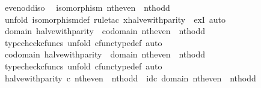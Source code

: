 \begin{isabellebody}
\endisatagproof
{\isafoldproof}%
%
\isadelimproof
\isanewline
%
\endisadelimproof
\isanewline
{}\isamarkupfalse%
\ even{\isacharunderscore}{\kern0pt}odd{\isacharunderscore}{\kern0pt}iso{\isacharcolon}{\kern0pt}\isanewline
\ \ {\isachardoublequoteopen}isomorphism\ {\isacharparenleft}{\kern0pt}nth{\isacharunderscore}{\kern0pt}even\ {\isasymamalg}\ nth{\isacharunderscore}{\kern0pt}odd{\isacharparenright}{\kern0pt}{\isachardoublequoteclose}\isanewline
%
\isadelimproof
%
\endisadelimproof
%
\isatagproof
{}\isamarkupfalse%
\ {\isacharparenleft}{\kern0pt}unfold\ isomorphism{\isacharunderscore}{\kern0pt}def{\isacharcomma}{\kern0pt}\ rule{\isacharunderscore}{\kern0pt}tac\ x{\isacharequal}{\kern0pt}halve{\isacharunderscore}{\kern0pt}with{\isacharunderscore}{\kern0pt}parity\ \ exI{\isacharcomma}{\kern0pt}\ auto{\isacharparenright}{\kern0pt}\isanewline
\ \ \isamarkupfalse%
\ {\isachardoublequoteopen}domain\ halve{\isacharunderscore}{\kern0pt}with{\isacharunderscore}{\kern0pt}parity\ {\isacharequal}{\kern0pt}\ codomain\ {\isacharparenleft}{\kern0pt}nth{\isacharunderscore}{\kern0pt}even\ {\isasymamalg}\ nth{\isacharunderscore}{\kern0pt}odd{\isacharparenright}{\kern0pt}{\isachardoublequoteclose}\isanewline
\ \ \ \ \isamarkupfalse%
\ {\isacharparenleft}{\kern0pt}typecheck{\isacharunderscore}{\kern0pt}cfuncs{\isacharcomma}{\kern0pt}\ unfold\ cfunc{\isacharunderscore}{\kern0pt}type{\isacharunderscore}{\kern0pt}def{\isacharcomma}{\kern0pt}\ auto{\isacharparenright}{\kern0pt}\isanewline
\ \ \isamarkupfalse%
\ {\isachardoublequoteopen}codomain\ halve{\isacharunderscore}{\kern0pt}with{\isacharunderscore}{\kern0pt}parity\ {\isacharequal}{\kern0pt}\ domain\ {\isacharparenleft}{\kern0pt}nth{\isacharunderscore}{\kern0pt}even\ {\isasymamalg}\ nth{\isacharunderscore}{\kern0pt}odd{\isacharparenright}{\kern0pt}{\isachardoublequoteclose}\isanewline
\ \ \ \ \isamarkupfalse%
\ {\isacharparenleft}{\kern0pt}typecheck{\isacharunderscore}{\kern0pt}cfuncs{\isacharcomma}{\kern0pt}\ unfold\ cfunc{\isacharunderscore}{\kern0pt}type{\isacharunderscore}{\kern0pt}def{\isacharcomma}{\kern0pt}\ auto{\isacharparenright}{\kern0pt}\isanewline
\ \ \isamarkupfalse%
\ {\isachardoublequoteopen}halve{\isacharunderscore}{\kern0pt}with{\isacharunderscore}{\kern0pt}parity\ {\isasymcirc}\isactrlsub c\ nth{\isacharunderscore}{\kern0pt}even\ {\isasymamalg}\ nth{\isacharunderscore}{\kern0pt}odd\ {\isacharequal}{\kern0pt}\ id\isactrlsub c\ {\isacharparenleft}{\kern0pt}domain\ {\isacharparenleft}{\kern0pt}nth{\isacharunderscore}{\kern0pt}even\ {\isasymamalg}\ nth{\isacharunderscore}{\kern0pt}odd{\isacharparenright}{\kern0pt}{\isacharparenright}{\kern0pt}{\isachardoublequoteclose}\isanewline

\end{isabellebody}
